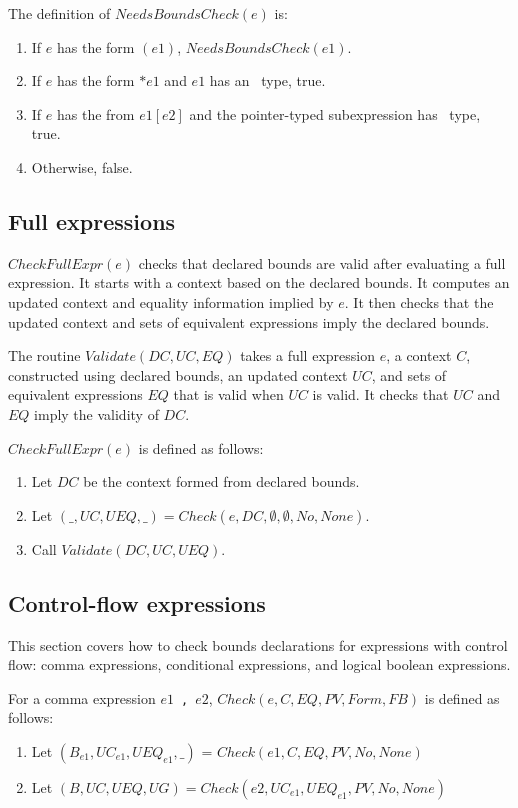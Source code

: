 The definition of $NeedsBoundsCheck(e)$ is:
\begin{enumerate}
\item If $e$ has the form $(e1)$, $NeedsBoundsCheck(e1).$
\item If $e$ has the form $*e1$ and $e1$ has an \arrayptr\ type, true.
\item If $e$ has the from $e1[e2]$ and the pointer-typed subexpression has \arrayptr\ type, true.
\item Otherwise, false.
\end{enumerate}


\subsection{Full expressions}

$CheckFullExpr(e)$ checks that declared bounds are valid after 
evaluating a full expression.  It starts with a context based on the
declared bounds. It computes an updated context and equality information
implied by $e$.  It then checks that the updated context 
and sets of equivalent expressions imply the declared bounds.

The routine $Validate(DC, \mathit{UC}, EQ)$ takes a full expression $e$, a context $C$,
constructed using declared bounds, an updated context $\mathit{UC}$, and sets of equivalent expressions $EQ$
that is valid when $\mathit{UC}$ is valid.  It checks that $\mathit{UC}$ and $EQ$ imply the validity of $DC$.

$CheckFullExpr(e)$ is defined as follows:
\begin{enumerate}
\item Let $DC$ be the context formed from declared bounds.
\item Let $(\_, \mathit{UC}, UEQ, \_) = Check(e, DC, \emptyset, \emptyset, No, None)$.
\item Call $Validate(DC, \mathit{UC}, UEQ)$.
\end{enumerate}

\subsection{Control-flow expressions}

This section covers how to check bounds declarations for expressions
with control flow: comma expressions, conditional expressions, and
logical boolean expressions.

For a comma expression $e1$~\lstinline|,|~$e2$, $Check(e, C, EQ, PV, Form, FB)$ is defined as follows:
\begin{enumerate}
\item Let $(B_{e1}, \mathit{UC}_{e1}, {UEQ}_{e1}, \_)$ = $Check(e1, C, EQ, PV, No, None)$
\item Let $(B, \mathit{UC}, UEQ, UG) = Check(e2, \mathit{UC}_{e1}, {UEQ}_{e1}, PV, No, None)$
\end{enumerate}

